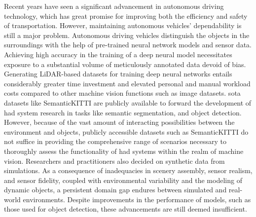 Recent years have seen a significant advancement in autonomous driving technology, which has great promise for improving both the efficiency and safety of transportation. However, maintaining autonomous vehicles' dependability is still a major problem. Autonomous driving vehicles distinguish the objects in the surroundings with the help of pre-trained neural network models and sensor data. Achieving high accuracy in the training of a deep neural model necessitates exposure to a substantial volume of meticulously annotated data devoid of bias. Generating LiDAR-based datasets for training deep neural networks entails considerably greater time investment and elevated personal and manual workload costs compared to other machine vision functions such as image datasets. \acrshort{sota} datasets like SemanticKITTI are publicly available to forward the development of \acrfull{had} system research in tasks like semantic segmentation, and object detection. However, because of the vast amount of interacting possibilities between the environment and objects, publicly accessible datasets such as SemanticKITTI do not suffice in providing the comprehensive range of scenarios necessary to thoroughly assess the functionality of \acrfull{had} systems within the realm of machine vision. Researchers and practitioners also decided on synthetic data from simulations. As a consequence of inadequacies in scenery assembly, sensor realism, and sensor fidelity, coupled with environmental variability and the modeling of dynamic objects, a persistent domain gap endures between simulated and real-world environments. Despite improvements in the performance of models, such as those used for object detection, these advancements are still deemed insufficient.

